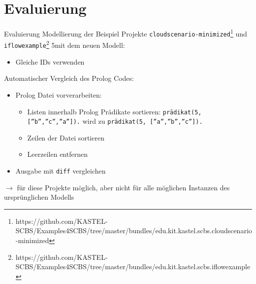 \documentclass{sdqbeamer}
\begin{document}
\section{Evaluierung}
\begin{frame}{Evaluierung}
	Modellierung der Beispiel Projekte \texttt{cloudscenario-minimized}\footnote{https://github.com/KASTEL-SCBS/Examples4SCBS/tree/master/bundles/edu.kit.kastel.scbs.cloudscenario-minimized} und \texttt{iflowexample}\footnote{https://github.com/KASTEL-SCBS/Examples4SCBS/tree/master/bundles/edu.kit.kastel.scbs.iflowexample} 5mit dem neuen Modell:
	\begin{itemize}
		\item Gleiche IDs verwenden
	\end{itemize}
	Automatischer Vergleich des Prolog Codes:
	\begin{itemize}
		\item Prolog Datei vorverarbeiten:
		\begin{itemize}
			\item Listen innerhalb Prolog Prädikate sortieren:
			\texttt{prädikat(5, [''b'',''c'',''a'']).} wird zu \texttt{prädikat(5, [''a'',''b'',''c'']).}
			\item Zeilen der Datei sortieren
			\item Leerzeilen entfernen
		\end{itemize}
		\item Ausgabe mit \texttt{diff} vergleichen
	\end{itemize}
 $\rightarrow$ für diese Projekte möglich, aber nicht für alle möglichen Instanzen des ursprünglichen Modells
\end{frame}

\appendix
\beginbackup
\backupend
\end{document}
